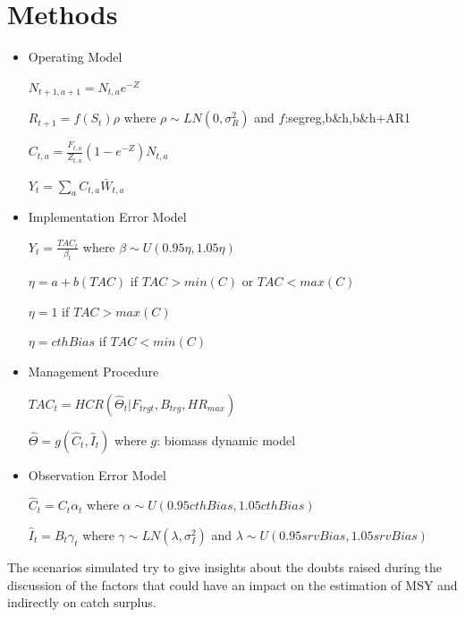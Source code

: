 \documentclass[a4paper]{article}
\begin{document}
\pagebreak
\section{Methods}

\begin{itemize}
	\item Operating Model

	$N_{t+1,a+1}=N_{t,a}e^{-Z}$
	
	$R_{t+1}=f(S_{t})\rho$ where $\rho \sim LN(0,\sigma_{R}^2)$ and $f$:{segreg,b\&h,b\&h+AR1}

	$C_{t,a}=\frac{F_{t,a}}{Z_{t,a}}(1-e^{-Z})N_{t,a}$
	
	$Y_{t}=\sum_a C_{t,a}\bar{W}_{t,a}$
	
	\item Implementation Error Model
	
	$Y_{t}=\frac{TAC_{t}}{\beta_{t}}$ where $\beta \sim U(0.95\eta, 1.05\eta)$ 
	
	$\eta=a+b(TAC)$ if $TAC>min(C)$ or $TAC<max(C)$ 
	
	$\eta=1$ if $TAC>max(C)$ 

	$\eta=cthBias$ if $TAC<min(C)$ 

	\item Management Procedure
	
	$TAC_{t}=HCR(\hat{\Theta}_{t} | F_{trgt}, B_{trg}, HR_{max})$
	
	$\hat{\Theta}=g(\hat{C}_{t}, \hat{I}_{t})$ where $g$: biomass dynamic model 
	
	\item Observation Error Model
	
	$\hat{C}_{t}=C_{t} \alpha_{t}$ where $\alpha \sim U(0.95cthBias, 1.05cthBias)$
	
	$\hat{I}_{t} = B_{t} \gamma_{t}$ where $\gamma \sim LN(\lambda, \sigma_{I}^2)$ and $\lambda \sim U(0.95srvBias, 1.05srvBias)$	
		
\end{itemize}	

The scenarios simulated try to give insights about the doubts raised during the discussion of the factors that could have an impact on the estimation of MSY and indirectly on catch surplus.
\end{document}
